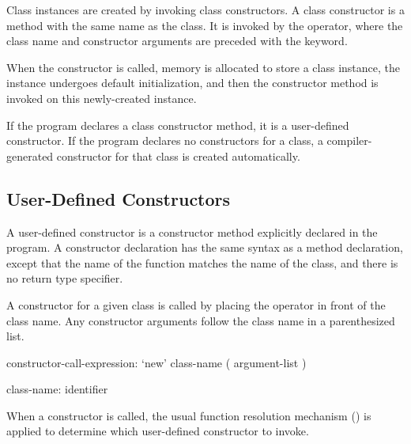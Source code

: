 Class instances are created by invoking class constructors.
A class constructor is a method with the same name as the class.
It is invoked by the  operator, where the
class name and constructor arguments are preceded with the
 keyword.

When the constructor is called, memory is allocated to store
a class instance, the instance undergoes default initialization, and
then the constructor method is invoked on this newly-created
instance.

If the program declares a class constructor method,
it is a user-defined constructor.  
If the program declares no constructors for a class,
a compiler-generated constructor for that class is created automatically.

\subsection{User-Defined Constructors}
\label{User_Defined_Constructors}

A user-defined constructor is a constructor method explicitly declared
in the program.  A constructor declaration has the same
syntax as a method declaration, except that the name of the function matches
the name of the class, and there is no return type specifier.

A constructor for a given class is called by placing the  operator
in front of the class name.  Any constructor arguments follow the class name in a
parenthesized list.

\begin{syntax}
constructor-call-expression:
  `new' class-name ( argument-list )

class-name:
  identifier
\end{syntax}

When a constructor is called, the usual function resolution mechanism
() is applied to determine which
user-defined constructor to invoke.

